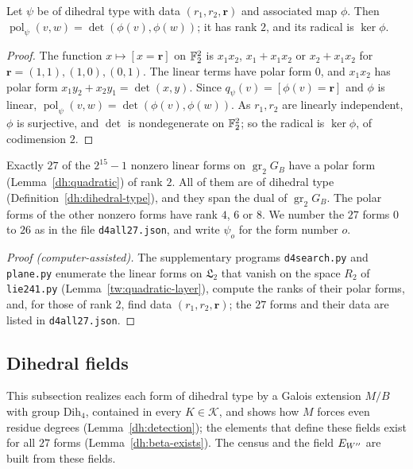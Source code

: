\begin{lemma}\label{dh:dihedral-polar}
Let $\psi$ be of dihedral type with data $(r_1,r_2,\mathbf r)$ and associated
map $\phi$. Then $\operatorname{pol}_\psi(v,w)=\det(\phi(v),\phi(w))$; it has
rank $2$, and its radical is $\ker\phi$.
\end{lemma}

\begin{proof}
The function $x\mapsto[x=\mathbf r]$ on $\mathbb F_2^2$ is $x_1x_2$, $x_1+x_1x_2$
or $x_2+x_1x_2$ for $\mathbf r=(1,1),(1,0),(0,1)$. The linear terms have
polar form $0$, and $x_1x_2$ has polar form $x_1y_2+x_2y_1=\det(x,y)$. Since
$q_\psi(v)=[\phi(v)=\mathbf r]$ and $\phi$ is linear,
$\operatorname{pol}_\psi(v,w)=\det(\phi(v),\phi(w))$. As $r_1,r_2$ are
linearly independent, $\phi$ is surjective, and $\det$ is nondegenerate on
$\mathbb F_2^2$; so the radical is $\ker\phi$, of codimension $2$.
\end{proof}

\begin{lemma}\label{dh:27}
Exactly $27$ of the $2^{15}-1$ nonzero linear forms on $\operatorname{gr}_2G_B$
have a polar form (Lemma~\ref{dh:quadratic}) of rank $2$. All of them are of
dihedral type (Definition~\ref{dh:dihedral-type}), and they span the dual of
$\operatorname{gr}_2G_B$. The polar forms of the other nonzero forms have rank
$4$, $6$ or $8$. We number the $27$ forms $0$ to $26$ as in the file
\texttt{d4all27.json}, and write $\psi_o$ for the form number $o$.
\end{lemma}

\begin{proof}[Proof (computer-assisted)]
The supplementary programs \texttt{d4search.py} and \texttt{plane.py}
enumerate the linear forms on $\mathfrak L_2$ that vanish on the space $R_2$
of \texttt{lie241.py} (Lemma~\ref{tw:quadratic-layer}), compute the ranks of
their polar forms, and, for those of rank $2$, find data $(r_1,r_2,\mathbf r)$;
the $27$ forms and their data are listed in \texttt{d4all27.json}.
\end{proof}

\subsection{Dihedral fields}\label{dh:fields-section}
This subsection realizes each form of dihedral type by a Galois extension
$M/B$ with group $\mathrm{Dih}_4$, contained in every $K\in\mathcal K$, and
shows how $M$ forces even residue degrees (Lemma~\ref{dh:detection}); the
elements that define these fields exist for all $27$ forms
(Lemma~\ref{dh:beta-exists}). The census and the field $E_{W''}$ are built from
these fields.

